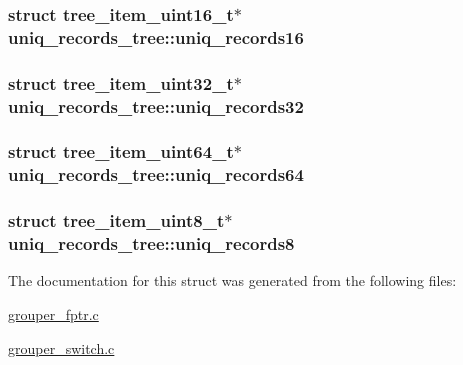 \hypertarget{structuniq__records__tree_a9df29b0df41a45e032b92224b454f52e}{
\subsubsection[{uniq\-\_\-records16}]{\setlength{\rightskip}{0pt plus 5cm}struct tree\-\_\-item\-\_\-uint16\-\_\-t$\ast$ {\bf uniq\-\_\-records\-\_\-tree\-::uniq\-\_\-records16}}}\label{structuniq__records__tree_a9df29b0df41a45e032b92224b454f52e}
\hypertarget{structuniq__records__tree_a5804158857fe19cae48836378cc109f7}{
\subsubsection[{uniq\-\_\-records32}]{\setlength{\rightskip}{0pt plus 5cm}struct tree\-\_\-item\-\_\-uint32\-\_\-t$\ast$ {\bf uniq\-\_\-records\-\_\-tree\-::uniq\-\_\-records32}}}\label{structuniq__records__tree_a5804158857fe19cae48836378cc109f7}
\hypertarget{structuniq__records__tree_a6fda0a82a4841a0d9df656535dd0a431}{
\subsubsection[{uniq\-\_\-records64}]{\setlength{\rightskip}{0pt plus 5cm}struct tree\-\_\-item\-\_\-uint64\-\_\-t$\ast$ {\bf uniq\-\_\-records\-\_\-tree\-::uniq\-\_\-records64}}}\label{structuniq__records__tree_a6fda0a82a4841a0d9df656535dd0a431}
\hypertarget{structuniq__records__tree_a62c665f69f3c41cf61d0fb3164bf6bb8}{
\subsubsection[{uniq\-\_\-records8}]{\setlength{\rightskip}{0pt plus 5cm}struct tree\-\_\-item\-\_\-uint8\-\_\-t$\ast$ {\bf uniq\-\_\-records\-\_\-tree\-::uniq\-\_\-records8}}}\label{structuniq__records__tree_a62c665f69f3c41cf61d0fb3164bf6bb8}


\-The documentation for this struct was generated from the following files\-:\begin{DoxyCompactItemize}
\item 
\hyperlink{grouper__fptr_8c}{grouper\-\_\-fptr.\-c}\item 
\hyperlink{grouper__switch_8c}{grouper\-\_\-switch.\-c}\end{DoxyCompactItemize}
